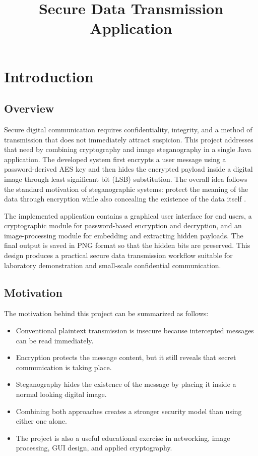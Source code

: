 \documentclass[12pt]{report}
\title{Secure Data Transmission Application}
\begin{document}
    
    \tableofcontents

\newpage
\chapter{Introduction}

\section{Overview}
Secure digital communication requires confidentiality, integrity, and a method of transmission that does not immediately attract suspicion. This project addresses that need by combining cryptography and image steganography in a single Java application. The developed system first encrypts a user message using a password-derived AES key and then hides the encrypted payload inside a digital image through least significant bit (LSB) substitution. The overall idea follows the standard motivation of steganographic systems: protect the meaning of the data through encryption while also concealing the existence of the data itself \cite{johnson1998exploring} \cite{fridrich2009steganography}.

The implemented application contains a graphical user interface for end users, a cryptographic module for password-based encryption and decryption, and an image-processing module for embedding and extracting hidden payloads. The final output is saved in PNG format so that the hidden bits are preserved. This design produces a practical secure data transmission workflow suitable for laboratory demonstration and small-scale confidential communication.

\section{Motivation}
The motivation behind this project can be summarized as follows:
\begin{itemize}
    \item Conventional plaintext transmission is insecure because intercepted messages can be read immediately.
    \item Encryption protects the message content, but it still reveals that secret communication is taking place.
    \item Steganography hides the existence of the message by placing it inside a normal looking digital image.
    \item Combining both approaches creates a stronger security model than using either one alone.
    \item The project is also a useful educational exercise in networking, image processing, GUI design, and applied cryptography.
\end{itemize}
\end{document}
